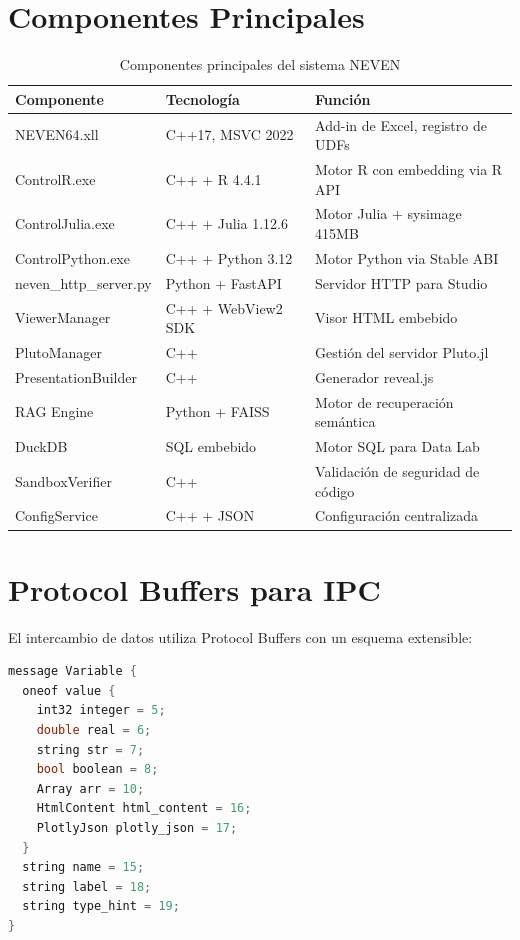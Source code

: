 \documentclass[12pt, a4paper]{report}
\begin{document}
\section{Componentes Principales}

\begin{table}[H]
\centering
\begin{tabular}{lll}
\toprule
\textbf{Componente} & \textbf{Tecnología} & \textbf{Función} \\
\midrule
NEVEN64.xll & C++17, MSVC 2022 & Add-in de Excel, registro de UDFs \\
ControlR.exe & C++ + R 4.4.1 & Motor R con embedding via R API \\
ControlJulia.exe & C++ + Julia 1.12.6 & Motor Julia + sysimage 415MB \\
ControlPython.exe & C++ + Python 3.12 & Motor Python via Stable ABI \\
neven\_http\_server.py & Python + FastAPI & Servidor HTTP para Studio \\
ViewerManager & C++ + WebView2 SDK & Visor HTML embebido \\
PlutoManager & C++ & Gestión del servidor Pluto.jl \\
PresentationBuilder & C++ & Generador reveal.js \\
RAG Engine & Python + FAISS & Motor de recuperación semántica \\
DuckDB & SQL embebido & Motor SQL para Data Lab \\
SandboxVerifier & C++ & Validación de seguridad de código \\
ConfigService & C++ + JSON & Configuración centralizada \\
\bottomrule
\end{tabular}
\caption{Componentes principales del sistema NEVEN}
\end{table}

\section{Protocol Buffers para IPC}

El intercambio de datos utiliza Protocol Buffers con un esquema extensible:

\begin{lstlisting}[language=C++, caption={Esquema Protobuf para variable.proto}]
message Variable {
  oneof value {
    int32 integer = 5;
    double real = 6;
    string str = 7;
    bool boolean = 8;
    Array arr = 10;
    HtmlContent html_content = 16;
    PlotlyJson plotly_json = 17;
  }
  string name = 15;
  string label = 18;
  string type_hint = 19;
}
\end{lstlisting}
\end{document}
